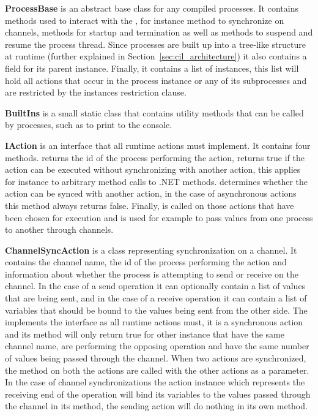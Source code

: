 	\textbf{ProcessBase} is an abstract base class for any compiled processes.
	It contains methods used to interact with the ,
	for instance method to synchronize on channels, methods for startup and
	termination as well as methods to suspend and resume the process thread.
	Since processes are built up into a tree-like structure at runtime (further 
	explained in Section~\ref{sec:cil_architecture}) it also contains a field 
	for its parent  instance. Finally, it contains a list of 
	 instances, this list will hold all actions that occur in 
	the process instance or any of its subprocesses and are restricted by the 
	instances restriction clause.
	
	\textbf{BuiltIns} is a small static class that contains utility methods
	that can be called by processes, such as to print to the console.
	
	\textbf{IAction} is an interface that all runtime actions must implement.
	It contains four methods.  returns the id of the
	process performing the action,  returns true if
	the action can be executed without synchronizing with another action, 
	this applies for instance to arbitrary method calls to .NET methods.
	 determines whether the action can be 
	synced with another action, in the case of asynchronous actions this
	method always returns false. Finally,  is 
	called on those actions that have been chosen for execution and is used
	for example to pass values from one process to another through channels.

	\textbf{ChannelSyncAction} is a class representing synchronization on a
	channel. It contains the channel name, the id of the process performing
	the action and information about whether the process is attempting to send
	or receive on the channel. In the case of a send operation it can optionally
	contain a list of values that are being sent, and in the case of a receive
	operation it can contain a list of variables that should be bound to the 
	values being sent from the other side. The 
	implements the  interface as all runtime actions must, it is
	a synchronous action and its  method will only return 
	true for other  instance that have the same
	channel name, are performing the opposing operation and have the same
	number of values being passed through the channel. When two actions are
	synchronized, the  method on both the actions
	are called with the other actions as a parameter. In the case of channel 
	synchronizations the action instance which represents the receiving end
	of the operation will bind its variables to the values passed through
	the channel in its  method, the sending action will do nothing
	in its own  method.
	
